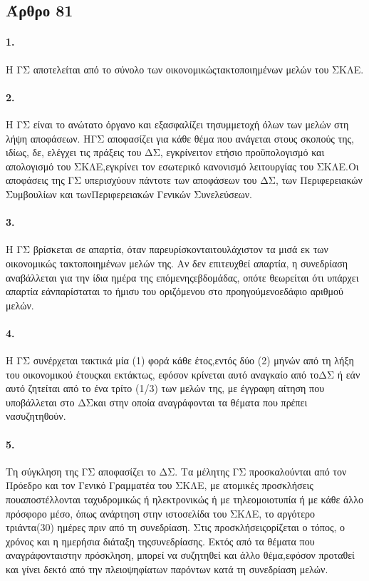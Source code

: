\documentclass[a4paper,oneside, 10pt]{book}
\begin{document}
\subsection*{ Άρθρο 81 }
\paragraph { 1. } Η ΓΣ αποτελείται από το σύνολο των οικονομικώςτακτοποιημένων μελών του ΣΚΛΕ.
\paragraph { 2. } Η ΓΣ είναι το ανώτατο όργανο και εξασφαλίζει τησυμμετοχή όλων των μελών στη λήψη αποφάσεων. ΗΓΣ αποφασίζει για κάθε θέμα που ανάγεται στους σκοπούς της, ιδίως, δε, ελέγχει τις πράξεις του ΔΣ, εγκρίνειτον ετήσιο προϋπολογισμό και απολογισμό του ΣΚΛΕ,εγκρίνει τον εσωτερικό κανονισμό λειτουργίας του ΣΚΛΕ.Οι αποφάσεις της ΓΣ υπερισχύουν πάντοτε των αποφάσεων του ΔΣ, των Περιφερειακών Συμβουλίων και τωνΠεριφερειακών Γενικών Συνελεύσεων.
\paragraph { 3. } Η ΓΣ βρίσκεται σε απαρτία, όταν παρευρίσκονταιτουλάχιστον τα μισά εκ των οικονομικώς τακτοποιημένων μελών της. Αν δεν επιτευχθεί απαρτία, η συνεδρίαση αναβάλλεται για την ίδια ημέρα της επόμενηςεβδομάδας, οπότε θεωρείται ότι υπάρχει απαρτία εάνπαρίσταται το ήμισυ του οριζόμενου στο προηγούμενοεδάφιο αριθμού μελών.
\paragraph { 4. } Η ΓΣ συνέρχεται τακτικά μία (1) φορά κάθε έτος,εντός δύο (2) μηνών από τη λήξη του οικονομικού έτουςκαι εκτάκτως, εφόσον κρίνεται αυτό αναγκαίο από τοΔΣ ή εάν αυτό ζητείται από το ένα τρίτο (1/3) των μελών της, με έγγραφη αίτηση που υποβάλλεται στο ΔΣκαι στην οποία αναγράφονται τα θέματα που πρέπει νασυζητηθούν.
\paragraph { 5. } Τη σύγκληση της ΓΣ αποφασίζει το ΔΣ. Τα μέλητης ΓΣ προσκαλούνται από τον Πρόεδρο και τον Γενικό Γραμματέα του ΣΚΛΕ, με ατομικές προσκλήσεις πουαποστέλλονται ταχυδρομικώς ή ηλεκτρονικώς ή με τηλεομοιοτυπία ή με κάθε άλλο πρόσφορο μέσο, όπως ανάρτηση στην ιστοσελίδα του ΣΚΛΕ, το αργότερο τριάντα(30) ημέρες πριν από τη συνεδρίαση. Στις προσκλήσειςορίζεται ο τόπος, ο χρόνος και η ημερήσια διάταξη τηςσυνεδρίασης. Εκτός από τα θέματα που αναγράφονταιστην πρόσκληση, μπορεί να συζητηθεί και άλλο θέμα,εφόσον προταθεί και γίνει δεκτό από την πλειοψηφίατων παρόντων κατά τη συνεδρίαση μελών.
\end{document}
